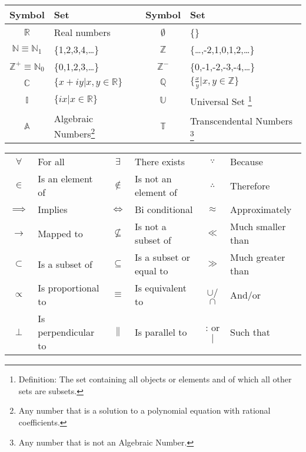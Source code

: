 \begin{fancybox}{}
	\begin{center}
		\begin{tabular}{c|l||c|l}
			Symbol &  Set  & Symbol & Set   \\
			\hline
			$\mathbb{R}$ & Real numbers & $\emptyset$ & \{\} \\
			$\mathbb{N}\equiv \mathbb{N}_1$ & \{1,2,3,4,\dots\} & $\mathbb{Z}$ & \{\dots,-2,1,0,1,2,\dots\} \\
			$\mathbb{Z}^+ \equiv \mathbb{N}_0$ & \{0,1,2,3,\dots\} & $\mathbb{Z}^-$ & \{0,-1,-2,-3,-4,\dots\} \\
			$\mathbb{C}$ & $\{x+iy | x,y \in \mathbb{R}\}$ & $\mathbb{Q}$ & $\{\frac{x}{y} | x,y \in \mathbb{Z}\}$ \\
			$\mathbb{I}$ & $\{ix|x\in \mathbb{R}\}$ & $\mathbb{U}$ & Universal Set \footnote{Definition: The set containing all objects or elements and of which all other sets are subsets.} \\
			$\mathbb{A}$ & Algebraic Numbers\footnote{Any number that is a solution to a polynomial equation with rational coefficients.} & $\mathbb{T}$ & Transcendental Numbers \footnote{Any number that is not an Algebraic Number.} 
		\end{tabular}
	\end{center}
\end{fancybox}

\begin{fancybox}{}
	\begin{center}
		\begin{tabular}{c|l||c|l||c|l}
			$\forall$ & For all & $\exists$ & There exists & $\because$ & Because\\ 
			$\in$ & Is an element of & $\notin$ & Is not an element of  & $\therefore$ & Therefore\\
			$\implies$ & Implies & $\Longleftrightarrow$ & Bi conditional & $\approx$ & Approximately\\
			$\longrightarrow$ & Mapped to & $\nsubseteq$ & Is not a subset of & $\ll$ & Much smaller than\\
			$\subset$& Is a subset of & $\subseteq$ & Is a subset or equal to  & $\gg$ & Much greater than\\
			$\propto$ & Is proportional to & $\equiv$ & Is equivalent to  & $\cup$/$\cap$ & And/or \\
			$\perp$ & Is perpendicular to & $\parallel$ & Is parallel to  & : or $|$ & Such that\\
		\end{tabular}
	\end{center}
\end{fancybox}

